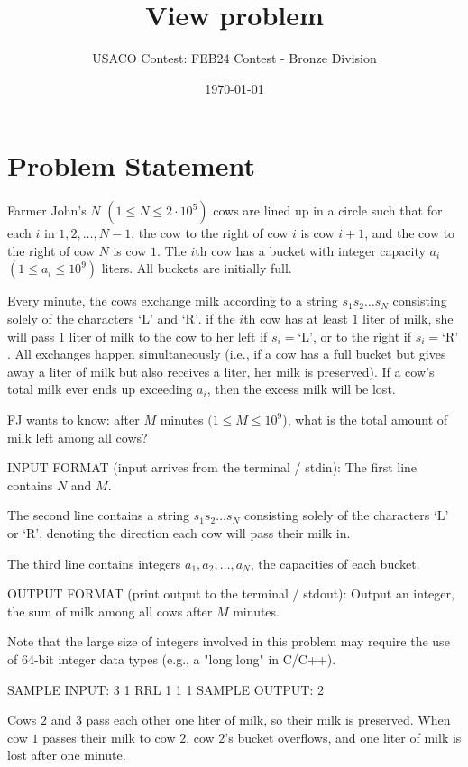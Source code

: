 \documentclass[12pt]{article}
\title{View problem}
\author{USACO Contest: FEB24 Contest - Bronze Division}
\date{\today}
\begin{document}
\maketitle

\section*{Problem Statement}


Farmer John's $N$ $(1 \leq N \leq 2 \cdot 10^5)$ cows are lined up in a circle
such that for each $i$ in $1,2,\dots,N-1$, the cow to the right of cow $i$ is
cow $i+1$, and the cow to the right of cow $N$ is cow $1$. The $i$th cow has a
bucket with integer capacity $a_i$ $(1 \leq a_i \leq 10^9)$ liters. All buckets
are initially full.

Every minute, the cows exchange milk according to a string $s_1s_2\dots s_N$ 
consisting solely of the characters $\text{‘L’}$ and $\text{‘R’}$.  if
the $i$th cow has at least $1$ liter of milk, she will pass $1$ liter of milk to
the cow to her left if $s_i=\text{‘L’}$, or to the right if
$s_i=\text{‘R’}$.  All exchanges happen simultaneously (i.e., if a cow has a
full bucket but gives away a liter of milk but also receives a liter, her milk
is preserved). If a cow's total milk ever ends up exceeding $a_i$, then the
excess milk will be lost.

FJ wants to know: after $M$ minutes $(1 \leq M \leq 10^9$), what is the total
amount of milk left among all cows?

INPUT FORMAT (input arrives from the terminal / stdin):
The first line contains $N$ and $M$.

The second line contains a string $s_1s_2\dots s_N$ consisting solely of the
characters $\text{‘L’}$ or $\text{‘R’}$, denoting the direction each cow
will pass their milk in.

The third line contains integers $a_1, a_2, \dots, a_N$, the capacities of each
bucket.

OUTPUT FORMAT (print output to the terminal / stdout):
Output an integer, the sum of milk among all cows after $M$ minutes.

Note that the large size of integers involved in this problem may require the
use of 64-bit integer data types (e.g., a "long long" in C/C++).

SAMPLE INPUT:
3 1
RRL
1 1 1
SAMPLE OUTPUT: 
2

Cows $2$ and $3$ pass each other one liter of milk, so their milk is preserved.
When cow $1$ passes their milk to cow $2$, cow $2$'s bucket overflows, and one
liter of milk is lost after one minute.
\end{document}
